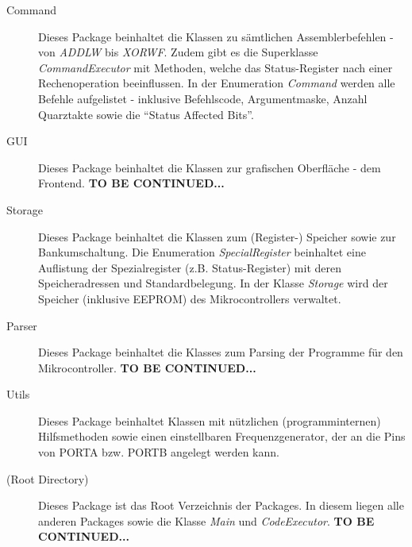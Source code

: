 \begin{description}
\item[Command]{Dieses Package beinhaltet die Klassen zu sämtlichen Assemblerbefehlen - von \textit{ADDLW} bis \textit{XORWF}. Zudem gibt es die Superklasse \textit{CommandExecutor} mit Methoden, welche das Status-Register nach einer Rechenoperation beeinflussen. In der Enumeration \textit{Command} werden alle Befehle aufgelistet - inklusive Befehlscode, Argumentmaske, Anzahl Quarztakte sowie die \enquote{Status Affected Bits}.}
\item[GUI]{Dieses Package beinhaltet die Klassen zur grafischen Oberfläche - dem Frontend. \textbf{TO BE CONTINUED...}}
\item[Storage]{Dieses Package beinhaltet die Klassen zum (Register-) Speicher sowie zur Bankumschaltung. Die Enumeration \textit{SpecialRegister} beinhaltet eine Auflistung der Spezialregister (z.B. Status-Register) mit deren Speicheradressen und Standardbelegung. In der Klasse \textit{Storage} wird der Speicher (inklusive EEPROM) des Mikrocontrollers verwaltet.}
\item[Parser]{Dieses Package beinhaltet die Klasses zum Parsing der Programme für den Mikrocontroller. \textbf{TO BE CONTINUED...}}
\item[Utils]{Dieses Package beinhaltet Klassen mit nützlichen (programminternen) Hilfsmethoden sowie einen einstellbaren Frequenzgenerator, der an die Pins von PORTA bzw. PORTB angelegt werden kann.}
\item[(Root Directory)]{Dieses Package ist das Root Verzeichnis der Packages. In diesem liegen alle anderen Packages sowie die Klasse \textit{Main} und \textit{CodeExecutor}. \textbf{TO BE CONTINUED...}}
\end{description}